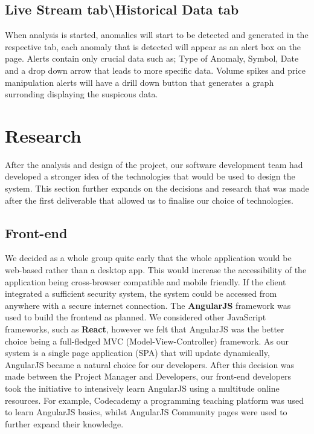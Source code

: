 \documentclass[12pt]{article}
\begin{document}
  \subsection{Live Stream tab\textbackslash Historical Data tab}
  When analysis is started, anomalies will start to be detected and generated in the respective tab, each anomaly that is detected will appear as an alert box on the page.
  Alerts contain only crucial data such as; Type of Anomaly, Symbol, Date and a drop down arrow that leads to more specific data.
  Volume spikes and price manipulation alerts will have a drill down button that generates a graph surronding displaying the suspicous data.
\section{Research}
  After the analysis and design of the project, our software development team had developed a stronger idea
  of the technologies that would be used to design the system. This section further expands on the decisions and
  research that was made after the first deliverable that allowed us to finalise our choice of technologies.
  \subsection{Front-end}
  We decided as a whole group quite early that the whole application would be web-based rather than a desktop app. This would
  increase the accessibility of the application being cross-browser compatible and mobile friendly. If the client integrated a sufficient
  security system, the system could be accessed from anywhere with a secure internet connection.\newline
  The \textbf{AngularJS} framework was used to build the frontend as planned. We considered other JavaScript frameworks,
  such as \textbf{React}, however we felt that AngularJS was the better choice being a full-fledged MVC (Model-View-Controller) framework.
  As our system is a single page application (SPA) that will update dynamically, AngularJS became a natural choice for our developers.
  \newline
  After this decision was made between the Project Manager and Developers, our front-end developers took the initiative to intensively learn AngularJS using a multitude online resources.
  For example, Codecademy a programming teaching platform was used to learn AngularJS basics, whilst AngularJS Community pages were used to further expand their knowledge.
\end{document}
